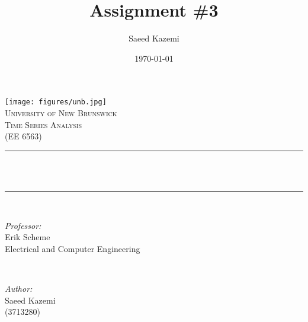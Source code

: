\documentclass[12pt]{article}
\title{Assignment \#3}				%
\author{Saeed Kazemi}				%
\date{\today}						%
\makeatletter
\let\thedate\@date
\let\thetitle\@title
\makeatother
\begin{document}


\begin{titlepage}
	\centering
    \vspace*{0.4 cm}
    \texttt{[image: figures/unb.jpg]}\\[1.0 cm]	%
    \textsc{\LARGE \newline\newline University of New Brunswick}\\[1.8 cm]	%
	\textsc{\Large Time Series Analysis\\(EE 6563)}\\[0.5 cm]				%
	\rule{\linewidth}{0.2 mm} \\[0.4 cm]
	{ \huge \bfseries \thetitle}\\
	\rule{\linewidth}{0.2 mm} \\[1.5 cm]
	
	\begin{minipage}{0.5\textwidth}
		\begin{flushleft} \large
			\emph{Professor:}\\
			Erik Scheme\\
            Electrical and Computer Engineering\\
			\end{flushleft}
			\end{minipage}~
			\begin{minipage}{0.5\textwidth}
            
			\begin{flushright} \large
			\emph{Author:} \\
			Saeed Kazemi\\ (3713280)\\

		\end{flushright}
        
	\end{minipage}\\[1 cm]
	
	
    \thedate
    
    
    
	
\end{titlepage}




\pagebreak
\end{document}

